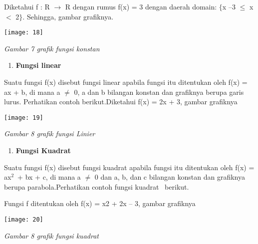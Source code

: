 \documentclass[11pt,fleqn]{book} %
\begin{document}
\noindent Diketahui f : R $\mathrm{\to}$ R dengan rumus f(x) = 3 dengan daerah domain: $\{$x {\textbar} --3 $\mathrm{\le}$ x $<$ 2$\}$. Sehingga, gambar grafiknya.

\begin{center}
\noindent \texttt{[image: 18]}
\end{center}

\textit{Gambar 7 grafik fungsi konstan}

\textit{}

\begin{enumerate}
\item \textit{ }\textbf{\textit{ }Fungsi linear\textit{}}
\end{enumerate}

\noindent Suatu fungsi f(x) disebut fungsi linear apabila fungsi itu ditentukan oleh f(x) = ax + b, di mana a $\mathrm{\neq}$ 0, a dan b bilangan konstan dan grafiknya berupa garis lurus. Perhatikan contoh berikut.Diketahui f(x) = 2x + 3, gambar grafiknya\textit{}

\begin{center}
\noindent \texttt{[image: 19]}
\end{center}

\noindent \textit{Gambar 8 grafik fungsi Linier}

\noindent 

\noindent 

\begin{enumerate}
\item  \textbf{Fungsi Kuadrat}
\end{enumerate}

\noindent 

\noindent Suatu fungsi f(x) disebut fungsi kuadrat apabila fungsi itu ditentukan oleh f(x) = ax${}^{2}$~+ bx + c, di mana a $\mathrm{\neq}$ 0 dan a, b, dan c bilangan konstan dan grafiknya berupa parabola.Perhatikan contoh fungsi kuadrat ~berikut.

Fungsi f ditentukan oleh f(x) = x2 + 2x -- 3, gambar grafiknya

\begin{center}
\noindent \texttt{[image: 20]}
\end{center}

\textit{     Gambar 8 grafik fungsi kuadrat}

\textbf{\textit{}}
\end{document}
